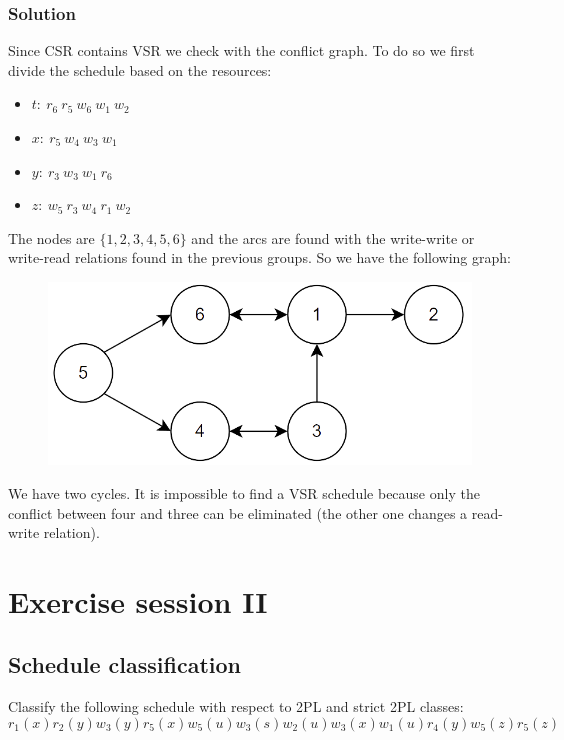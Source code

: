 \documentclass[12pt, a4paper]{report}
\begin{document}
    \subsection*{Solution}
        Since CSR contains VSR we check with the conflict graph. To do so we first divide the schedule based on the resources: 
        \begin{itemize}
            \item $t: \: r_6 \: r_5 \: w_6 \: w_1 \: w_2$
            \item $x: \: r_5 \: w_4 \: w_3 \: w_1$
            \item $y: \: r_3 \: w_3 \: w_1 \: r_6$
            \item $z: \: w_5 \: r_3 \: w_4 \: r_1 \: w_2$
        \end{itemize}
        The nodes are $\{1,2,3,4,5,6\}$ and the arcs are found with the write-write or write-read relations found in the previous groups. So we have the following graph:
        \begin{figure}[H]
            \centering
            \includegraphics[width=0.5\linewidth]{images/conflictgraph3.png}
        \end{figure}
        We have two cycles. It is impossible to find a VSR schedule because only the conflict between four and three can be eliminated (the other one changes a read-write relation).

    \newpage

    \chapter{Exercise session II}
    \section{Schedule classification}
        Classify the following schedule with respect to 2PL and strict 2PL classes: 
        \[r_1(x) r_2(y) w_3(y) r_5(x) w_5(u) w_3(s) w_2(u) w_3(x) w_1(u) r_4(y) w_5(z) r_5(z)\]
\end{document}
